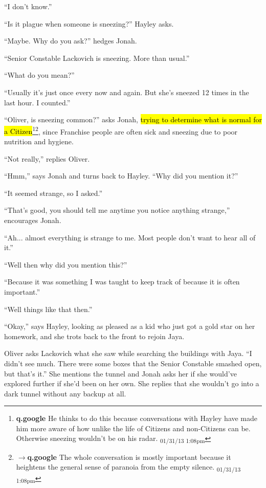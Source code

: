 ``I don't know.'' 

``Is it plague when someone is sneezing?'' Hayley asks.

``Maybe.  Why do you ask?'' hedges Jonah.

``Senior Constable Lackovich is sneezing.  More than usual.''

``What do you mean?''

``Usually it's just once every now and again.  But she's sneezed 12 times in the last hour.  I counted.''

``Oliver, is sneezing common?'' asks Jonah, \hl{trying to determine what is normal for a Citizen}\footnote{\textbf{q.google }He thinks to do this because conversations with Hayley have made him more aware of how unlike the life of Citizens and non-Citizens can be.  Otherwise sneezing wouldn't be on his radar. \textsubscript{01/31/13 1:08pm}}\footnote{$\rightarrow$\textbf{q.google }The whole conversation is mostly important because it heightens the general sense of paranoia from the empty silence. \textsubscript{01/31/13 1:08pm}}, since Franchise people are often sick and sneezing due to poor nutrition and hygiene.

``Not really,'' replies Oliver.

``Hmm,'' says Jonah and turns back to Hayley.  ``Why did you mention it?''

``It seemed strange, so I asked.''

``That's good, you should tell me anytime you notice anything strange,'' encourages Jonah.

``Ah... almost everything is strange to me.  Most people don't want to hear all of it.''

``Well then why did you mention this?''

``Because it was something I was taught to keep track of because it is often important.''

``Well things like that then.''

``Okay,'' says Hayley, looking as pleased as a kid who just got a gold star on her homework, and she trots back to the front to rejoin Jaya.



Oliver asks Lackovich what she saw while searching the buildings with Jaya.  ``I didn't see much.  There were some boxes that the Senior Constable smashed open, but that's it.''  She mentions the tunnel and Jonah asks her if she would've explored further if she'd been on her own.  She replies that she wouldn't go into a dark tunnel without any backup at all.



